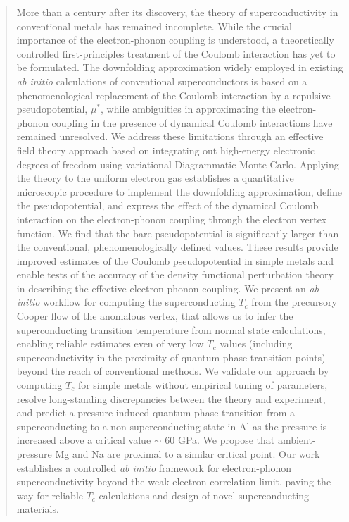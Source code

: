 \documentclass[%
 reprint,
superscriptaddress,
 amsmath,amssymb,
 aps,
prx,
]{revtex4-2}
\begin{document}
\date{\today}%
\begin{abstract}
More than a  century after its discovery, the theory of superconductivity in conventional metals has remained incomplete. While the crucial importance of the electron-phonon coupling is understood,  a theoretically controlled first-principles treatment of the Coulomb interaction has yet to be formulated. The downfolding approximation widely employed in existing \emph{ab initio} calculations of conventional superconductors is based on a phenomenological replacement of the Coulomb interaction by a repulsive pseudopotential, $\mu^*$, while ambiguities in approximating the electron-phonon coupling in the presence of dynamical Coulomb interactions have remained unresolved. We address these limitations through an effective field theory approach based on integrating out high-energy electronic degrees of freedom using variational Diagrammatic Monte Carlo. Applying the theory to the uniform electron gas establishes a quantitative microscopic procedure to implement the downfolding approximation, define the pseudopotential, and express the effect of the dynamical Coulomb interaction on the electron-phonon coupling through the electron vertex function. We find that the bare pseudopotential is significantly larger than the conventional, phenomenologically defined values. These results provide improved estimates of the Coulomb pseudopotential in simple metals and enable tests of the accuracy of the density functional perturbation theory in describing the effective electron-phonon coupling. We present an \emph{ab initio} workflow for computing the superconducting $T_c$ from the precursory Cooper flow of the anomalous vertex, that allows us to infer the superconducting transition temperature from  normal state calculations, enabling reliable estimates even of very low $T_c$ values (including superconductivity in the proximity of quantum phase transition points) beyond the reach of conventional methods. We validate our approach by computing $T_c$ for simple metals without empirical tuning of parameters, resolve long-standing discrepancies between the theory and experiment, and predict a pressure-induced quantum phase transition from a superconducting to a non-superconducting state in Al as the pressure is increased above a critical value $\sim$ 60 GPa. We propose that ambient-pressure Mg and Na are proximal to a similar critical point. Our work establishes a controlled \emph{ab initio} framework for electron-phonon superconductivity beyond the weak electron correlation limit, paving the way for reliable $T_c$ calculations and design of novel superconducting materials.
\end{abstract}
\end{document}
